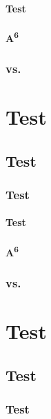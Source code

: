 \documentclass[series=CorpusAvesticum,gitver=true,PhD=false,tocdepth=subfivesection]{brill}
\begin{document}
\subsection{Test}
\subsection{A\textsuperscript{6}}
\section{\Av{\XVE} vs. }
\part{Test}
\chapter{Test}

\section{Test}

\subsection{Test}
\subsection{A\textsuperscript{6}}
\section{\Av{\XVE} vs. }
\part{Test}
\chapter{Test}

\section{Test}
\end{document}
